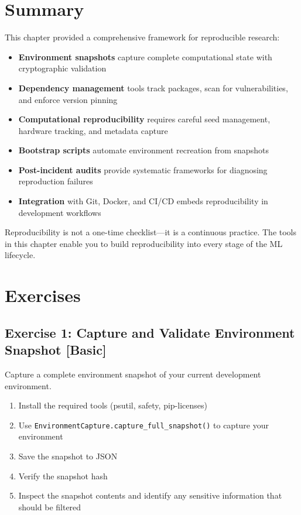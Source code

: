 \section{Summary}

This chapter provided a comprehensive framework for reproducible research:

\begin{itemize}
    \item \textbf{Environment snapshots} capture complete computational state with cryptographic validation

    \item \textbf{Dependency management} tools track packages, scan for vulnerabilities, and enforce version pinning

    \item \textbf{Computational reproducibility} requires careful seed management, hardware tracking, and metadata capture

    \item \textbf{Bootstrap scripts} automate environment recreation from snapshots

    \item \textbf{Post-incident audits} provide systematic frameworks for diagnosing reproduction failures

    \item \textbf{Integration} with Git, Docker, and CI/CD embeds reproducibility in development workflows
\end{itemize}

Reproducibility is not a one-time checklist---it is a continuous practice. The tools in this chapter enable you to build reproducibility into every stage of the ML lifecycle.

\section{Exercises}

\subsection{Exercise 1: Capture and Validate Environment Snapshot [Basic]}

Capture a complete environment snapshot of your current development environment.

\begin{enumerate}
    \item Install the required tools (psutil, safety, pip-licenses)
    \item Use \texttt{EnvironmentCapture.capture\_full\_snapshot()} to capture your environment
    \item Save the snapshot to JSON
    \item Verify the snapshot hash
    \item Inspect the snapshot contents and identify any sensitive information that should be filtered
\end{enumerate}

